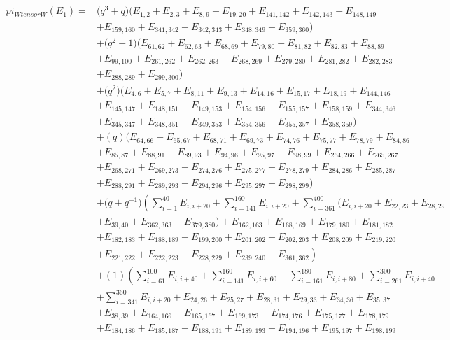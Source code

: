 \documentclass[10pt,a4paper]{amsart}
\numberwithin{equation}{section}
\theoremstyle{definition}
\def\pi{pi}
\def\otimes{ tensor }
\begin{document}
\begin{align*}
 \pi_{W \otimes W}(E_1) ={} &\bigl(q^3+q\bigr)(E_{1,2}+E_{2,3}+E_{8,9}+E_{19,20}+E_{141,142}+E_{142,143}+E_{148,149}\\
 &+E_{159,160}+E_{341,342}+E_{342,343}+E_{348,349}+E_{359,360}) \\
 &+\bigl(q^2+1\bigr)(E_{61,62}+E_{62,63}+E_{68,69}+E_{79,80}+E_{81,82}+E_{82,83}+E_{88,89} \\
 &+E_{99,100}+E_{261,262}+E_{262,263}+E_{268,269}+E_{279,280}+E_{281,282}+E_{282,283} \\
 &+E_{288,289}+E_{299,300})\\
 &+\bigl(q^2\bigr)(E_{4,6}+E_{5,7}+E_{8,11}+E_{9,13}+E_{14,16}+E_{15,17}+E_{18,19}+E_{144,146}\\
 &+E_{145,147}+E_{148,151}+E_{149,153}+E_{154,156}+E_{155,157}+E_{158,159}+E_{344,346}\\
 &+E_{345,347}+E_{348,351}+E_{349,353}+E_{354,356}+E_{355,357}+E_{358,359})\\
 &+(q)(E_{64,66}+E_{65,67}+E_{68,71}+E_{69,73}+E_{74,76}+E_{75,77}+E_{78,79}+E_{84,86} \\
 &+E_{85,87}+E_{88,91}+E_{89,93}+E_{94,96}+E_{95,97}+E_{98,99}+E_{264,266}+E_{265,267}\\
 &+E_{268,271}+E_{269,273}+E_{274,276} +E_{275,277}+E_{278,279}+E_{284,286}+E_{285,287}\\
 &+E_{288,291}+E_{289,293}+E_{294,296}+E_{295,297}+E_{298,299}) \\
 &+\bigl(q+q^{-1}\bigr)\left( \sum_{i=1}^{40} E_{i,i+20} + \sum_{i=141}^{160} E_{i,i+20} +\sum_{i=361}^{400}\bigl(E_{i,i+20} + E_{22,23}+E_{28,29} \right. \\
 &+E_{39,40}+E_{362,363}+E_{379,380}\bigr)+E_{162,163}+E_{168,169}+E_{179,180}+E_{181,182}\\
 &+E_{182,183}+E_{188,189}+E_{199,200}+E_{201,202}+E_{202,203}+E_{208,209}+E_{219,220}\\
 &\left.+E_{221,222}+E_{222,223}+E_{228,229}+E_{239,240}+E_{361,362} \right) \\
 &+(1) \left( \sum_{i=61}^{100} E_{i,i+40} + \sum_{i=141}^{160} E_{i,i+60}+\sum_{i=161}^{180} E_{i,i+80} +\sum_{i=261}^{300} E_{i,i+40} \right. \\
 &+\sum_{i=341}^{360}E_{i,i+20}+E_{24,26}+E_{25,27}+E_{28,31}+E_{29,33}+E_{34,36}+E_{35,37}\\
 &+E_{38,39}+E_{164,166}+E_{165,167}+E_{169,173}+E_{174,176}+E_{175,177}+E_{178,179}\\
 &+E_{184,186}+E_{185,187}+E_{188,191}+E_{189,193}+E_{194,196}+E_{195,197}+E_{198,199}\\

\end{align*}
\end{document}
